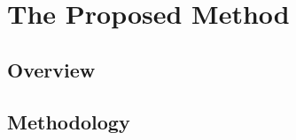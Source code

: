 \documentclass[../main.tex]{subfiles}
\begin{document}
\chapter{The Proposed Method}
\label{sec:method}


\section{Overview}

\section{Methodology}


\end{document}
